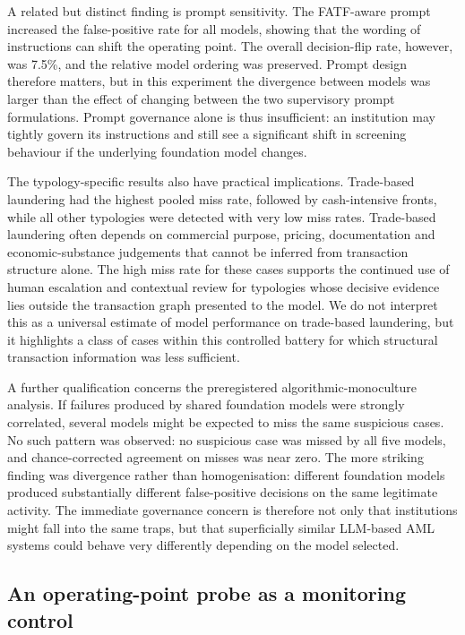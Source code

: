 \documentclass[pdflatex,sn-basic,Numbered]{sn-jnl}
\newcommand{\HLcode}[1]{\texthl{#1}}
\newcommand{\HLhead}[1]{\textcolor{HLink}{#1}}
\renewcommand{\HLhead}[1]{#1}\renewcommand{\HLcode}[1]{#1}%
\begin{document}
A related but distinct finding is prompt sensitivity. The FATF-aware prompt increased the false-positive rate for all models, showing that the wording of instructions can shift the operating point. The overall decision-flip rate, however, was 7.5\%, and the relative model ordering was preserved. Prompt design therefore matters, but in this experiment the divergence between models was larger than the effect of changing between the two supervisory prompt formulations. Prompt governance alone is thus insufficient: an institution may tightly govern its instructions and still see a significant shift in screening behaviour if the underlying foundation model changes.

The typology-specific results also have practical implications. Trade-based laundering had the highest pooled miss rate, followed by cash-intensive fronts, while all other typologies were detected with very low miss rates. Trade-based laundering often depends on commercial purpose, pricing, documentation and economic-substance judgements that cannot be inferred from transaction structure alone. The high miss rate for these cases supports the continued use of human escalation and contextual review for typologies whose decisive evidence lies outside the transaction graph presented to the model. We do not interpret this as a universal estimate of model performance on trade-based laundering, but it highlights a class of cases within this controlled battery for which structural transaction information was less sufficient.

A further qualification concerns the preregistered algorithmic-monoculture analysis. If failures produced by shared foundation models were strongly correlated, several models might be expected to miss the same suspicious cases. No such pattern was observed: no suspicious case was missed by all five models, and chance-corrected agreement on misses was near zero. The more striking finding was divergence rather than homogenisation: different foundation models produced substantially different false-positive decisions on the same legitimate activity. The immediate governance concern is therefore not only that institutions might fall into the same traps, but that superficially similar LLM-based AML systems could behave very differently depending on the model selected.

\subsection{\HLhead{An operating-point probe as a monitoring control}}\label{sec:probe}
\end{document}
